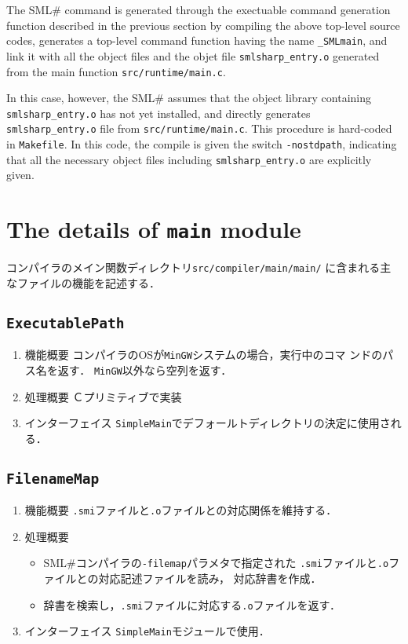 \documentclass{jbook}
\newcommand{\txt}[2]{#2}
\newcommand{\smlsharp}{SML\#}
\newcommand{\code}[1]{\mbox{\large\tt #1}}
\begin{document}
	The \smlsharp{} command is generated through the 
exectuable command generation function described in the previous section
by compiling the above top-level source codes, generates a top-level
command function having the name \code{\_SMLmain}, and link it with all
the object files and the objet file \code{smlsharp\_entry.o} generated 
from the main function \code{src/runtime/main.c}.

	In this case, however, the \smlsharp{} assumes that the object
library containing \code{smlsharp\_entry.o} has not yet installed, 
and directly generates \code{smlsharp\_entry.o} file from 
\code{src/runtime/main.c}.
	This procedure is hard-coded in \code{Makefile}.
	In this code, the compile is given the switch \code{-nostdpath},
indicating that all the necessary object files including 
\code{smlsharp\_entry.o} are explicitly given.
\fi%

\section{\txt{\code{main}モジュールの詳細}{The details of \code{main} module}}

\ifjp%
	コンパイラのメイン関数ディレクトリ\code{src/compiler/main/main/}
に含まれる主なファイルの機能を記述する．

\subsection{\code{ExecutablePath}}
\begin{enumerate}
\item 機能概要 コンパイラのOSが\code{MinGW}システムの場合，実行中のコマ
ンドのパス名を返す．
	\code{MinGW}以外なら空列を返す．
\item 処理概要 Ｃプリミティブで実装
\item インターフェイス \code{SimpleMain}でデフォールトディレクトリの決定に使用される．
\end{enumerate}
	
\subsection{\code{FilenameMap}}
\begin{enumerate}
\item 機能概要 \code{.smi}ファイルと\code{.o}ファイルとの対応関係を維持する．
\item 処理概要 
\begin{itemize}
\item \smlsharp{}コンパイラの\code{-filemap}パラメタで指定された
\code{.smi}ファイルと\code{.o}ファイルとの対応記述ファイルを読み，
対応辞書を作成．
\item 辞書を検索し，\code{.smi}ファイルに対応する\code{.o}ファイルを返す．
\end{itemize}
\item インターフェイス \code{SimpleMain}モジュールで使用．
\end{enumerate}
\end{document}
